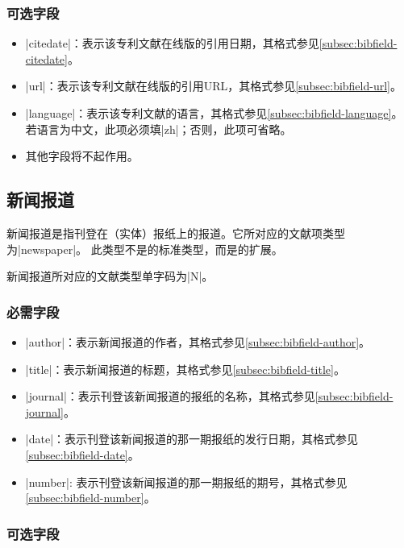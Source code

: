 \subsubsection{可选字段}

\begin{itemize}
\item |citedate|：表示该专利文献在线版的引用日期，其格式参见\ref{subsec:bibfield-citedate}。
\item |url|：表示该专利文献在线版的引用URL，其格式参见\ref{subsec:bibfield-url}。
\item |language|：表示该专利文献的语言，其格式参见\ref{subsec:bibfield-language}。
  若语言为中文，此项必须填|zh|；否则，此项可省略。
\item 其他字段将不起作用。
\end{itemize}

\subsection{新闻报道}\label{subsec:bibtype-newspaper}

新闻报道是指刊登在（实体）报纸上的报道。它所对应的{\BibTeX}文献项类型为|newspaper|。
此类型不是{\BibTeX}的标准类型，而是{\njuthesis}的扩展。

新闻报道所对应的文献类型\cite{gbt3469-1983}单字码为|N|。

\subsubsection{必需字段}

\begin{itemize}
\item |author|：表示新闻报道的作者，其格式参见\ref{subsec:bibfield-author}。
\item |title|：表示新闻报道的标题，其格式参见\ref{subsec:bibfield-title}。
\item |journal|：表示刊登该新闻报道的报纸的名称，其格式参见\ref{subsec:bibfield-journal}。
\item |date|：表示刊登该新闻报道的那一期报纸的发行日期，其格式参见\ref{subsec:bibfield-date}。
\item |number|: 表示刊登该新闻报道的那一期报纸的期号，其格式参见\ref{subsec:bibfield-number}。
\end{itemize}

\subsubsection{可选字段}

